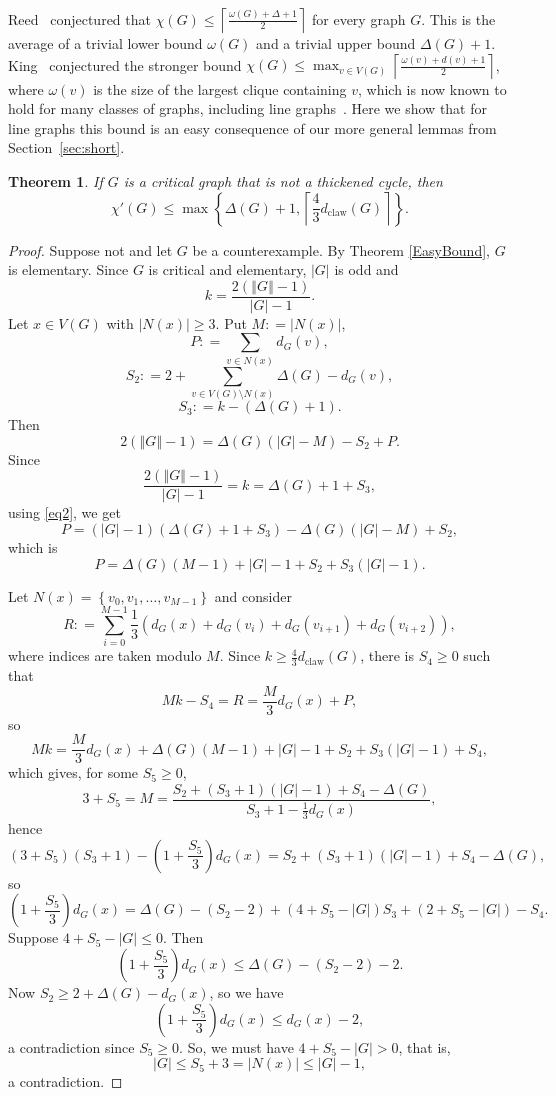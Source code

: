 \documentclass[12pt]{amsart}
\theoremstyle{plain}
\newtheorem{thm}{Theorem}
\theoremstyle{definition}
\theoremstyle{remark}
\newcommand{\set}[1]{\left\{ #1 \right\}}
\newcommand{\card}[1]{\left|#1\right|}
\newcommand{\size}[1]{\left\Vert#1\right\Vert}
\newcommand{\ceil}[1]{\left\lceil#1\right\rceil}
\newcommand{\parens}[1]{\left( #1 \right)}
\newcommand{\DefinedAs}{\mathrel{\mathop:}=}
\newcommand{\dclaw}[1]{d_{\text{claw}}\left( #1 \right)}
\begin{document}
Reed~\cite{Reed1998omega} conjectured that $\chi(G)\le
\ceil{\frac{\omega(G)+\Delta+1}2}$ for every
graph $G$.  This is the average of a trivial lower bound $\omega(G)$ and a
trivial upper bound $\Delta(G)+1$.  King~\cite{King} conjectured the stronger
bound $\chi(G)\le \max_{v\in V(G)}\ceil{\frac{\omega(v)+d(v)+1}2}$, where
$\omega(v)$ is the size of the largest clique containing $v$, which is now known
to hold for many classes of graphs, including line graphs~\cite{CKPS}.  Here we
show that for line graphs this bound is an easy consequence of our more general
lemmas from Section~\ref{sec:short}.  

\begin{thm}
\label{EasyBound2}
If $G$ is a critical graph that is not a thickened cycle, then
\[\chi'(G) \le \max\set{\Delta(G) + 1, \ceil{\frac43\dclaw{G}}}.\]
\end{thm}
\begin{proof}
Suppose not and let $G$ be a counterexample. By Theorem \ref{EasyBound}, $G$ is elementary.
Since $G$ is critical and elementary, $\card{G}$ is odd and
\begin{equation}\label{eq1}
k = \frac{2(\size{G} - 1)}{\card{G} - 1}.
\end{equation}
Let $x \in V(G)$ with $\card{N(x)} \ge 3$. Put $M \DefinedAs \card{N(x)}$, 
\[P \DefinedAs \sum_{v \in N(x)} d_G(v),\]
\[S_2 \DefinedAs 2 + \sum_{v \in V(G) \setminus N(x)} \Delta(G) - d_G(v),\]
\[S_3 \DefinedAs k - (\Delta(G) + 1).\] 
Then
\begin{equation}\label{eq2}
2(\size{G} - 1) = \Delta(G)(|G| - M) - S_2 + P.
\end{equation}
Since 
\[\frac{2(\size{G} - 1)}{\card{G} - 1} = k = \Delta(G) + 1 + S_3,\]
using \eqref{eq2}, we get
\[P = (|G| - 1)(\Delta(G) + 1 + S_3) - \Delta(G)(|G| - M) + S_2,\]
which is
\begin{equation}\label{eq3}
P = \Delta(G)(M-1) + |G| - 1 + S_2 + S_3(|G| - 1).
\end{equation}

Let $N(x) = \set{v_0, v_1, \ldots, v_{M-1}}$ and consider
\[R \DefinedAs \sum_{i=0}^{M - 1} \frac13 \parens{d_G(x) + d_G(v_i) + d_G(v_{i+1}) + d_G(v_{i+2})},\]
where indices are taken modulo $M$.  Since $k \ge \frac43\dclaw{G}$, there is $S_4 \ge 0$ such that
\[Mk - S_4 = R = \frac{M}{3}d_G(x) + P,\]
so
\[Mk = \frac{M}{3}d_G(x) + \Delta(G)(M-1) + |G| - 1 + S_2 + S_3(|G| - 1) + S_4,\]
which gives, for some $S_5 \ge 0$,
\[3 + S_5 = M =  \frac{S_2 + (S_3 + 1)(|G| - 1) + S_4 -\Delta(G)}{S_3 + 1 - \frac13d_G(x)}, \]
hence
\[(3 + S_5)(S_3 + 1) - \parens{1 + \frac{S_5}{3}}d_G(x) = S_2 + (S_3 + 1)(|G| - 1) + S_4 -\Delta(G),\]
so
\[\parens{1 + \frac{S_5}{3}}d_G(x) = \Delta(G)  - (S_2 - 2) + \parens{4 + S_5 - |G|}S_3 + \parens{2 + S_5 - |G|} - S_4.\]
Suppose $4 + S_5 - |G| \le 0$.  Then
\[\parens{1 + \frac{S_5}{3}}d_G(x) \le \Delta(G)  - (S_2 - 2) - 2.\]
Now $S_2 \ge 2 + \Delta(G) - d_G(x)$, so we have
\[\parens{1 + \frac{S_5}{3}}d_G(x) \le d_G(x) - 2,\]
a contradiction since $S_5 \ge 0$.  So, we must have $4 + S_5 - |G| > 0$, that is, 
\[|G| \le S_5 + 3 = |N(x)| \le |G| - 1,\] a contradiction.
\end{proof}
\end{document}
